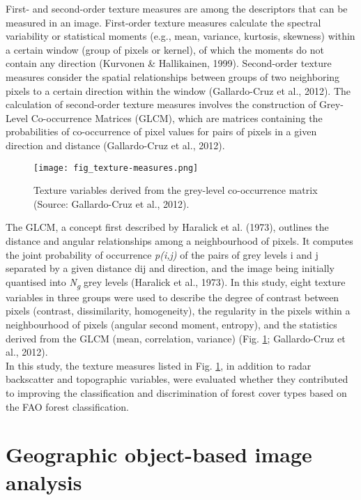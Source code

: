 First- and second-order texture measures are among the descriptors that can be measured in an image. First-order texture measures calculate the spectral variability or statistical moments (e.g., mean, variance, kurtosis, skewness) within a certain window (group of pixels or kernel), of which the moments do not contain any direction (Kurvonen \& Hallikainen, 1999). Second-order texture measures consider the spatial relationships between groups of two neighboring pixels to a certain direction within the window (Gallardo-Cruz et al., 2012). The calculation of second-order texture measures involves the construction of Grey-Level Co-occurrence Matrices (GLCM), which are matrices containing the probabilities of co-occurrence of pixel values for pairs of pixels in a given direction and distance (Gallardo-Cruz et al., 2012).

\begin{figure}
	\centering
	\texttt{[image: fig\_texture-measures.png]}
	\caption[Texture variables derived from the grey-level co-occurrence matrix.]{Texture variables derived from the grey-level co-occurrence matrix (Source: Gallardo-Cruz et al., 2012).}
	\label{fig: litrev-fig2.4}
\end{figure}

The GLCM, a concept first described by Haralick et al. (1973), outlines the distance and angular relationships among a neighbourhood of pixels. It computes the joint probability of occurrence \textit{p(i,j)} of the pairs of grey levels i and j separated by a given distance dij and direction, and the image being initially quantised into \textit{N\textsubscript{g}} grey levels (Haralick et al., 1973). In this study, eight texture variables in three groups were used to describe the degree of contrast between pixels (contrast, dissimilarity, homogeneity), the regularity in the pixels within a neighbourhood of pixels (angular second moment, entropy), and the statistics derived from the GLCM (mean, correlation, variance) (Fig. \ref{fig: litrev-fig2.4}; Gallardo-Cruz et al., 2012).\\

In this study, the texture measures listed in Fig. \ref{fig: litrev-fig2.4}, in addition to radar backscatter and topographic variables, were evaluated whether they contributed to improving the classification and discrimination of forest cover types based on the FAO forest classification.

\section{Geographic object-based image analysis}
\label{sec: litrev-geobia}


